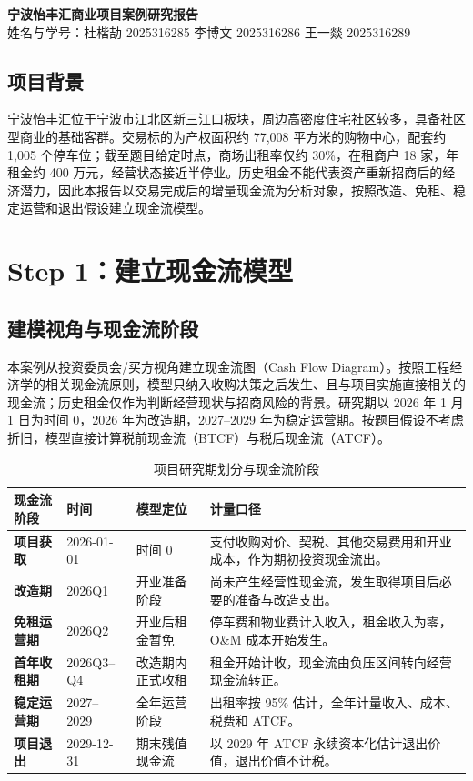 \documentclass[11pt,a4paper]{ctexart}
\begin{document}
\begin{center}
  {\fontsize{18}{21}\selectfont\bfseries\color{titleblue} 宁波怡丰汇商业项目案例研究报告}\\[5pt]
  {\small 姓名与学号：杜楷劼 2025316285 \quad 李博文 2025316286 \quad 王一燚 2025316289}
\end{center}

\subsection*{项目背景}

宁波怡丰汇位于宁波市江北区新三江口板块，周边高密度住宅社区较多，具备社区型商业的基础客群。交易标的为产权面积约 77,008 平方米的购物中心，配套约 1,005 个停车位；截至题目给定时点，商场出租率仅约 30\%，在租商户 18 家，年租金约 400 万元，经营状态接近半停业。历史租金不能代表资产重新招商后的经济潜力，因此本报告以交易完成后的增量现金流为分析对象，按照改造、免租、稳定运营和退出假设建立现金流模型。

\section{Step 1：建立现金流模型}

\subsection{建模视角与现金流阶段}

本案例从投资委员会/买方视角建立现金流图（Cash Flow Diagram）。按照工程经济学的相关现金流原则，模型只纳入收购决策之后发生、且与项目实施直接相关的现金流；历史租金仅作为判断经营现状与招商风险的背景。研究期以 2026 年 1 月 1 日为时间 0，2026 年为改造期，2027--2029 年为稳定运营期。按题目假设不考虑折旧，模型直接计算税前现金流（BTCF）与税后现金流（ATCF）。

\begin{table}[H]
  \centering
  \caption{项目研究期划分与现金流阶段}
  \footnotesize
  \begin{tabularx}{\textwidth}{>{\bfseries}p{2.3cm} p{2.1cm} p{3.0cm} X}
    \toprule
    现金流阶段 & 时间 & 模型定位 & 计量口径 \\
    \midrule
    项目获取 & 2026-01-01 & 时间 0 & 支付收购对价、契税、其他交易费用和开业成本，作为期初投资现金流出。 \\
    改造期 & 2026Q1 & 开业准备阶段 & 尚未产生经营性现金流，发生取得项目后必要的准备与改造支出。 \\
    免租运营期 & 2026Q2 & 开业后租金暂免 & 停车费和物业费计入收入，租金收入为零，O\&M 成本开始发生。 \\
    首年收租期 & 2026Q3--Q4 & 改造期内正式收租 & 租金开始计收，现金流由负压区间转向经营现金流转正。 \\
    稳定运营期 & 2027--2029 & 全年运营阶段 & 出租率按 95\% 估计，全年计量收入、成本、税费和 ATCF。 \\
    项目退出 & 2029-12-31 & 期末残值现金流 & 以 2029 年 ATCF 永续资本化估计退出价值，退出价值不计税。 \\
    \bottomrule
  \end{tabularx}
\end{table}
\end{document}
